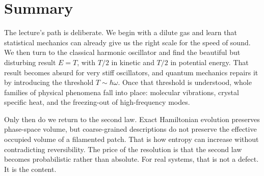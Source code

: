\section{Summary}

The lecture's path is deliberate. We begin with a dilute gas and learn that statistical mechanics can already give us the right scale for the speed of sound. We then turn to the classical harmonic oscillator and find the beautiful but disturbing result \(E=T\), with \(T/2\) in kinetic and \(T/2\) in potential energy. That result becomes absurd for very stiff oscillators, and quantum mechanics repairs it by introducing the threshold \(T\sim\hbar\omega\). Once that threshold is understood, whole families of physical phenomena fall into place: molecular vibrations, crystal specific heat, and the freezing-out of high-frequency modes.

Only then do we return to the second law. Exact Hamiltonian evolution preserves phase-space volume, but coarse-grained descriptions do not preserve the effective occupied volume of a filamented patch. That is how entropy can increase without contradicting reversibility. The price of the resolution is that the second law becomes probabilistic rather than absolute. For real systems, that is not a defect. It is the content.